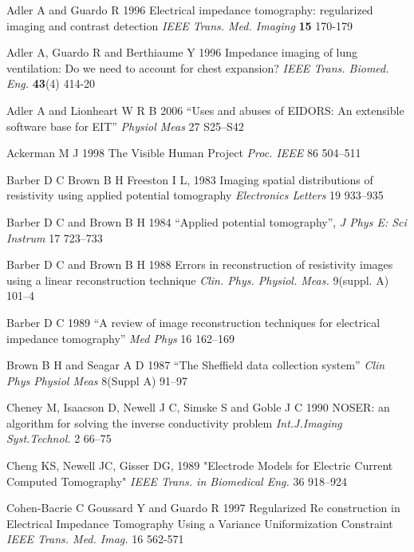 \documentclass[12pt]{iopart}
\begin{document}
\References %
\item[]
Adler A and Guardo R 1996 Electrical impedance tomography:
regularized imaging and contrast detection {\em IEEE Trans. Med.
Imaging} {\bf 15} 170-179

\item[]
Adler A, Guardo R and Berthiaume Y 1996 Impedance imaging of lung
ventilation: Do we need to account for chest expansion? {\em IEEE
Trans. Biomed. Eng.} {\bf 43}(4) 414-20


\item[]
Adler A and Lionheart W R B 2006
``Uses and abuses of EIDORS: An extensible software base for EIT''
{\em Physiol Meas}
27 S25--S42

\item[]
Ackerman M J  1998  
The Visible Human Project
{\em Proc. IEEE}
86 504--511


\item[]
Barber D C
Brown B H
Freeston I L, 1983
Imaging spatial distributions of resistivity using applied potential tomography
{\em Electronics Letters}
19 933--935


\item[]
Barber D C and Brown B H 1984
``Applied potential tomography'', 
{\em J Phys E: Sci Instrum}
 17 723--733

\item[]
Barber D C and Brown B H 1988 Errors in reconstruction of
resistivity images using a linear reconstruction technique {\em
Clin. Phys. Physiol. Meas.} 
9(suppl. A) 101--4

\item[]
Barber D C 1989
``A review of image reconstruction techniques for electrical
 impedance tomography''
{\em Med Phys}
16 162--169

\item[]
Brown B H and Seagar A D 1987 
``The Sheffield data collection system''
{\em Clin Phys Physiol Meas}
 8(Suppl A) 91--97

\item[]
Cheney M, Isaacson D, Newell J C, Simske S and Goble J C 1990
NOSER: an algorithm for solving the inverse conductivity problem
{\em Int.J.Imaging Syst.Technol.} 
2 66--75

\item[]
Cheng KS, Newell JC, Gisser DG, 1989
"Electrode Models for Electric Current Computed Tomography"
{\em IEEE Trans. in Biomedical Eng.}
36 918--924


\item[]
Cohen-Bacrie C  Goussard Y and Guardo R
1997
Regularized Re construction in Electrical
Impedance Tomography Using a Variance
Uniformization Constraint 
{\em IEEE Trans. Med. Imag.} 16 562-571
\end{document}
